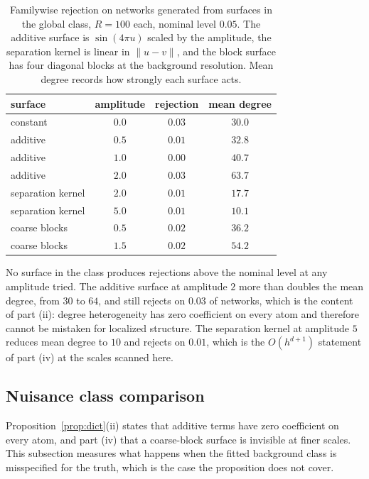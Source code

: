 \documentclass[11pt]{article}
\theoremstyle{definition}
\newcommand{\1}{\mathbf 1}\newcommand{\op}{\operatorname}
\begin{document}
\begin{table}[t]\centering
\caption{Familywise rejection on networks generated from surfaces in the
global class, $R=100$ each, nominal level $0.05$.  The additive surface is
$\sin(4\pi u)$ scaled by the amplitude, the separation kernel is linear in
$\|u-v\|$, and the block surface has four diagonal blocks at the background
resolution.  Mean degree records how strongly each surface acts.}
                                                            \label{tab:invis}
\begin{tabular}{lccc}
\hline
surface & amplitude & rejection & mean degree\\
\hline
constant             & $0.0$ & $0.03$ & $30.0$\\
additive             & $0.5$ & $0.01$ & $32.8$\\
additive             & $1.0$ & $0.00$ & $40.7$\\
additive             & $2.0$ & $0.03$ & $63.7$\\
separation kernel    & $2.0$ & $0.01$ & $17.7$\\
separation kernel    & $5.0$ & $0.01$ & $10.1$\\
coarse blocks        & $0.5$ & $0.02$ & $36.2$\\
coarse blocks        & $1.5$ & $0.02$ & $54.2$\\
\hline
\end{tabular}
\end{table}

No surface in the class produces rejections above the nominal level at any
amplitude tried.  The additive surface at amplitude $2$ more than doubles the
mean degree, from $30$ to $64$, and still rejects on $0.03$ of networks, which
is the content of part (ii): degree heterogeneity has zero coefficient on
every atom and therefore cannot be mistaken for localized structure.  The
separation kernel at amplitude $5$ reduces mean degree to $10$ and rejects on
$0.01$, which is the $O(h^{d+1})$ statement of part (iv) at the scales scanned
here.

\subsection{Nuisance class comparison}                \label{sec:nuisancestudy}

Proposition~\ref{prop:dict}(ii) states that additive terms have zero
coefficient on every atom, and part (iv) that a coarse-block surface is
invisible at finer scales.  This subsection measures what happens when the
fitted background class is misspecified for the truth, which is the case the
proposition does not cover.
\end{document}
